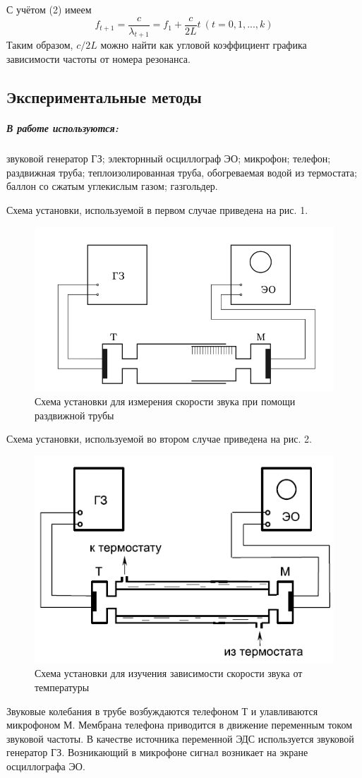 \documentclass[12pt,a4paper]{article}
\begin{document}
С учётом (2) имеем
	\begin{equation}
	f_{t+1} = \frac{c}{\lambda_{t+1}} = f_1 + \frac{c}{2L}t~ (t = 0, 1,..., k)
	\end{equation}
Таким образом, $c/2L$ можно найти как угловой коэффициент графика зависимости частоты от номера резонанса.

\subsection*{Экспериментальные методы}

\subparagraph{В работе используются:} звуковой генератор ГЗ; электорнный осциллограф ЭО; микрофон; телефон; раздвижная труба; теплоизолированная труба, обогреваемая водой из термостата; баллон со сжатым углекислым газом; газгольдер.

 Схема установки, используемой в первом случае приведена на рис. 1.
	\begin{figure}[htp]
		\centering
		\includegraphics[width=0.5\linewidth]{2.png}
		\caption{Схема установки для измерения скорости звука при помощи раздвижной трубы}
	\end{figure}
	
 Схема установки, используемой во втором случае приведена на рис. 2.
	\begin{figure}[htp]
		\centering
		\includegraphics[width=0.4\linewidth]{1.png}
		\caption{Схема установки для изучения зависимости скорости звука от температуры}
	\end{figure}
	
Звуковые колебания в трубе возбуждаются телефоном Т и улавливаются микрофоном М. Мембрана телефона приводится в движение переменным током звуковой частоты. В качестве источника переменной ЭДС используется звуковой генератор ГЗ. Возникающий в микрофоне сигнал возникает на экране осциллографа ЭО.
\end{document}
